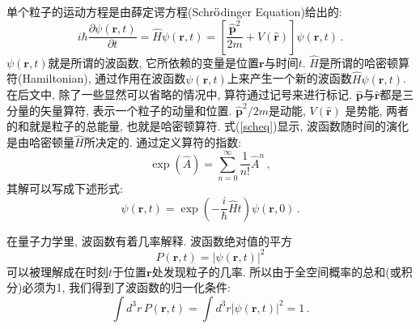 \documentclass[b5paper]{book}
\begin{document}
单个粒子的运动方程是由薛定谔方程(Schr$\ddot{{\rm o}}$dinger Equation)给出的:
\begin{equation}\label{scheq}
i\hbar\frac{\partial \psi(\mathbf{r},t)}{\partial t}=\hat{H}\psi(\mathbf{r},t)=\left[\frac{\hat{\mathbf{p}}^2}{2m}+V(\hat{\mathbf{r}})\right]\psi(\mathbf{r},t)\,.
\end{equation}
$\psi(\mathbf{r},t)$就是所谓的波函数, 它所依赖的变量是位置$\mathbf{r}$与时间$t$. $\hat{H}$是所谓的哈密顿算符(Hamiltonian), 通过作用在波函数$\psi(\mathbf{r},t)$上来产生一个新的波函数$\hat{H}\psi(\mathbf{r},t)$. 在后文中, 除了一些显然可以省略的情况中, 算符通过$\hat{}$记号来进行标记. $\hat{\mathbf{p}}$与$\hat{\mathbf{r}}$都是三分量的矢量算符, 表示一个粒子的动量和位置. $\hat{\mathbf{p}}^2/2m$是动能, $V(\hat{\mathbf{r}})$ 是势能, 两者的和就是粒子的总能量, 也就是哈密顿算符. 式(\ref{scheq})显示, 波函数随时间的演化是由哈密顿量$\hat{H}$所决定的. 通过定义算符的指数:
\begin{equation}
\exp(\hat{A})=\sum_{n=0}^\infty\frac{1}{n!}\hat{A}^n\,,
\end{equation}
其解可以写成下述形式:
\begin{equation}
\psi(\mathbf{r},t)=\exp\left(-\frac{i}{\hbar}\hat{H}t\right)\psi(\mathbf{r},0)\,.
\end{equation}

在量子力学里, 波函数有着几率解释. 波函数绝对值的平方
\begin{equation}
P(\mathbf{r},t)=|\psi(\mathbf{r},t)|^2
\end{equation}
可以被理解成在时刻$t$于位置$\mathbf{r}$处发现粒子的几率. 所以由于全空间概率的总和(或积分)必须为1, 我们得到了波函数的归一化条件:
\begin{equation}
\int d^3r\,P(\mathbf{r},t)=\int d^3r|\psi(\mathbf{r},t)|^2=1\,.
\end{equation}
\end{document}
